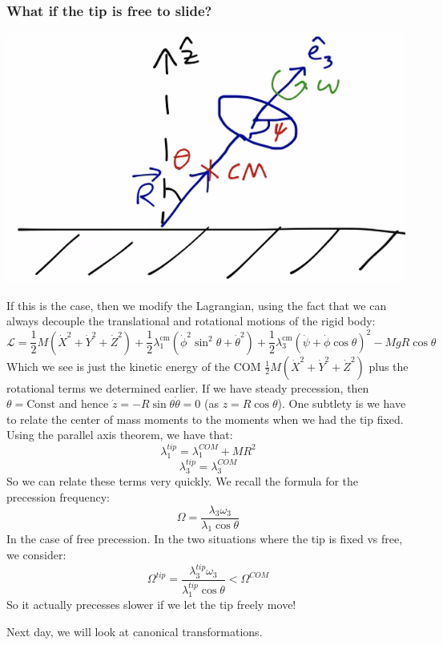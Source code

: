 \subsubsection{What if the tip is free to slide?}
\begin{center}
    \includegraphics[scale=0.7]{Lecture-34/l34-img7.png}
\end{center}
If this is the case, then we modify the Lagrangian, using the fact that we can always decouple the translational and rotational motions of the rigid body:
\[\mathcal{L}=\frac{1}{2} M\left(\dot{X}^{2}+\dot{Y}^{2}+\dot{Z}^{2}\right)+\frac{1}{2} \lambda_{1}^{\mathrm{cm}}\left(\dot{\phi}^{2} \sin ^{2} \theta+\dot{\theta}^{2}\right)+\frac{1}{2} \lambda_{3}^{\mathrm{cm}}(\dot{\psi}+\dot{\phi} \cos \theta)^{2}-M g R \cos \theta\]
Which we see is just the kinetic energy of the COM $\frac{1}{2} M\left(\dot{X}^{2}+\dot{Y}^{2}+\dot{Z}^{2}\right)$ plus the rotational terms we determined earlier. If we have steady precession, then $\theta = \text{Const}$ and hence $\dot{z} = -R\sin\theta\dot{\theta} = 0$ (as $z = R\cos\theta$). One subtlety is we have to relate the center of mass moments to the moments when we had the tip fixed. Using the parallel axis theorem, we have that:
\[\lambda_1^{tip} = \lambda_1^{COM} + MR^2\]
\[\lambda_3^{tip} = \lambda_3^{COM}\]
So we can relate these terms very quickly. We recall the formula for the precession frequency:
\[\Omega = \frac{\lambda_3\omega_3}{\lambda_1\cos\theta}\]
In the case of free precession. In the two situations where the tip is fixed vs free, we consider:
\[\Omega^{tip} = \frac{\lambda_3^{tip}\omega_3}{\lambda_1^{tip}\cos\theta} < \Omega^{COM}\]
So it actually precesses slower if we let the tip freely move!

Next day, we will look at canonical transformations.